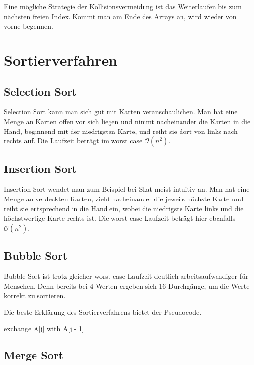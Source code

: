 \documentclass[10pt,a4paper,oneside,ngerman,numbers=noenddot]{scrartcl}
\begin{document}
	Eine mögliche Strategie der Kollisionsvermeidung ist das Weiterlaufen bis zum nächsten freien Index. Kommt man am Ende des Arrays an, wird wieder von vorne begonnen.
	
\section{Sortierverfahren}

	\subsection{Selection Sort}
	
		Selection Sort kann man sich gut mit Karten veranschaulichen. Man hat eine Menge an Karten offen vor sich liegen und nimmt nacheinander die Karten in die Hand, beginnend mit der niedrigsten Karte, und reiht sie dort von links nach rechts auf. Die Laufzeit beträgt im worst case $\mathcal{O}(n^{2})$.
		
	\subsection{Insertion Sort}
	
		Insertion Sort wendet man zum Beispiel bei Skat meist intuitiv an. Man hat eine Menge an verdeckten Karten, zieht nacheinander die jeweils höchste Karte und reiht sie entsprechend in die Hand ein, wobei die niedrigste Karte links und die höchstwertige Karte rechts ist. Die worst case Laufzeit beträgt hier ebenfalls $\mathcal{O}(n^{2})$.
		
	\subsection{Bubble Sort}
	
		Bubble Sort ist trotz gleicher worst case Laufzeit deutlich arbeitsaufwendiger für Menschen. Denn bereits bei 4 Werten ergeben sich 16 Durchgänge, um die Werte korrekt zu sortieren.
		
		Die beste Erklärung des Sortierverfahrens bietet der Pseudocode.
		
		\begin{algorithmic}[1]
							\State exchange A[j] with A[j - 1]
						\EndIf
					\EndFor
				\EndFor
			\EndProcedure
		\end{algorithmic}
		
	\subsection{Merge Sort}
	
\end{document}
